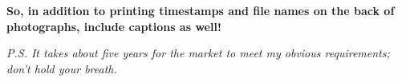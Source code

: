 \medskip

\textbf{So, in addition to printing timestamps and file names on the
back of photographs, include captions as well!}

\medskip

\emph{P.S. It takes about five years for the market to meet my obvious
requirements; don't hold your breath.}






%